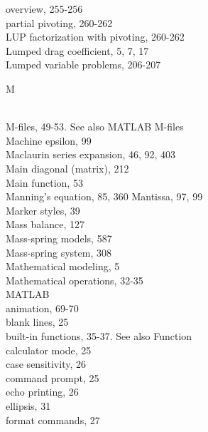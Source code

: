\documentclass[../main.tex]{subfiles}
\begin{document}
\begin{multicols}{3}
    \hspace*{3mm}overview, 255-256\\
    \hspace*{3mm}partial pivoting, 260-262\\
    LUP factorization with pivoting, 260-262\\
    Lumped drag coefficient, 5, 7, 17\\
    Lumped variable problems, 206-207\vspace*{2mm}\\
    \begin{huge} M \end{huge}\\
    M-files, 49-53. See also MATLAB M-files\\
    Machine epsilon, 99\\
    Maclaurin series expansion, 46, 92, 403\\
    Main diagonal (matrix), 212\\
    Main function, 53\\
    Manning's equation, 85, 360
    Mantissa, 97, 99\\
    Marker styles, 39\\
    Mass balance, 127\\
    Mass-spring models, 587\\
    Mass-spring system, 308\\
    Mathematical modeling, 5\\
    Mathematical operations, 32-35\\
    MATLAB\\
    \hspace*{3mm}animation, 69-70\\
    \hspace*{3mm}blank lines, 25\\
    \hspace*{3mm}built-in functions, 35-37. See also Function\\
    \hspace*{3mm}calculator mode, 25\\
    \hspace*{3mm}case sensitivity, 26\\
    \hspace*{3mm}command prompt, 25\\
    \hspace*{3mm}echo printing, 26\\
    \hspace*{3mm}ellipsis, 31\\
    \hspace*{3mm}format commands, 27\\

\end{multicols}
\end{document}
